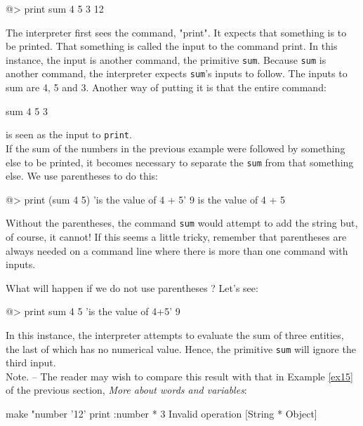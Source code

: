 \begin{verbatimtab} 
@> print sum 4 5 3
12
\end{verbatimtab}
 
The interpreter first sees the command, "print".  It expects that something is to be printed.  That something is called the input to the command print.  In this instance, the input is another command, the primitive \verb+sum+.  Because \verb+sum+ is another command, the interpreter expects \verb+sum+'s inputs to follow.  The inputs to sum are 4, 5 and 3.  Another way of putting it is that the entire command:
 
\begin{verbatimtab}
sum 4 5 3  
\end{verbatimtab}
 
is seen as the input to \verb+print+.\\ 
  
If the sum of the numbers in the previous example were followed by something else to be printed, it becomes necessary to separate the \verb+sum+ from that something else.   We use parentheses to do this: 

\begin{verbatimtab} 
@> print (sum 4 5) 'is the value of 4 + 5' 
9 is the value of 4 + 5
\end{verbatimtab}  

Without the parentheses, the command \verb+sum+ would attempt to add the string but, of course, it cannot!  If this seems a little tricky, remember that parentheses are always needed on a command line where there is more than one command with inputs.

What will happen if we do not use parentheses ?  Let's see: 
 
\begin{verbatimtab} 
@> print sum 4 5 'is the value of 4+5'
9
\end{verbatimtab}  

In this instance, the interpreter attempts to evaluate the sum of three entities, the last of which has no numerical value.  Hence, the primitive {\tt sum} will ignore the third input.\\ 
 
Note. -- The reader may wish to compare this result with that in Example \ref{ex15} of the previous section, {\em More about words and variables}:
 
\begin{verbatimtab} 
make "number '12' 
print :number * 3
Invalid operation [String * Object]
\end{verbatimtab}  
 
